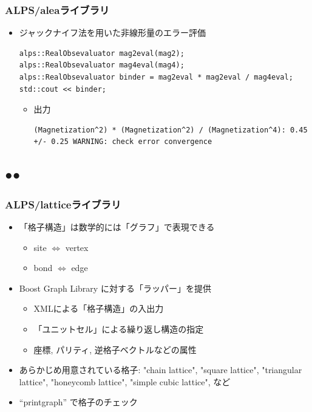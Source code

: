 \begin{frame}[t,fragile]
  \frametitle{ALPS/aleaライブラリ}
  \begin{itemize}
  \item ジャックナイフ法を用いた非線形量のエラー評価
    \begin{lstlisting}
alps::RealObsevaluator mag2eval(mag2);
alps::RealObsevaluator mag4eval(mag4);
alps::RealObsevaluator binder = mag2eval * mag2eval / mag4eval;
std::cout << binder;
\end{lstlisting}
  \begin{itemize}
  \item 出力
\begin{lstlisting}
(Magnetization^2) * (Magnetization^2) / (Magnetization^4): 0.45 +/- 0.25 WARNING: check error convergence
\end{lstlisting}
  \end{itemize}
  \end{itemize}
\end{frame}

\subsection*{{\protect\color{red}●}{\protect\color{blue}●}}

\begin{frame} 
  \frametitle{ALPS/latticeライブラリ}
  \begin{itemize}
    \setlength{\itemsep}{1em}
  \item 「格子構造」は数学的には「グラフ」で表現できる
    \begin{itemize}
    \item site $\Leftrightarrow$ vertex
    \item bond $\Leftrightarrow$ edge
    \end{itemize}
  \item Boost Graph Library に対する「ラッパー」を提供
    \begin{itemize}
    \item XMLによる「格子構造」の入出力
    \item 「ユニットセル」による繰り返し構造の指定
    \item 座標, パリティ, 逆格子ベクトルなどの属性
    \end{itemize}
  \item あらかじめ用意されている格子: "chain lattice", "square lattice", "triangular lattice", "honeycomb lattice", "simple cubic lattice", など
  \item ``printgraph'' で格子のチェック
  \end{itemize}
\end{frame}

